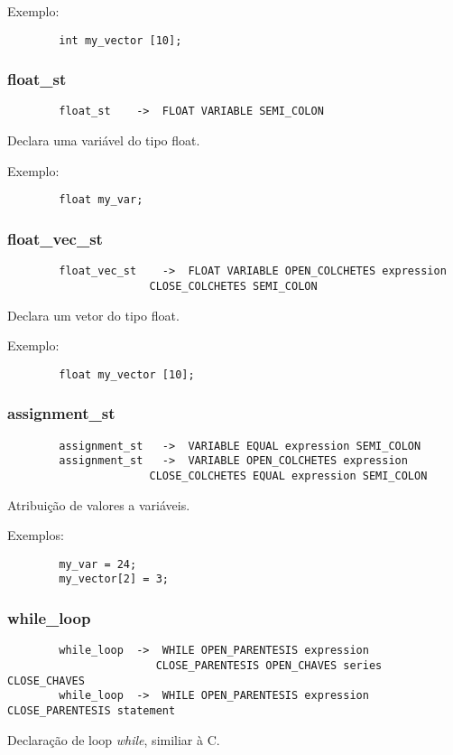 \documentclass[a4paper,10pt]{article}
\begin{document}
		Exemplo:
		\begin{lstlisting}
		int my_vector [10];
		\end{lstlisting}
		\vspace{10mm}
	\subsubsection{float\_st}
		\begin{lstlisting}
		float_st	->	FLOAT VARIABLE SEMI_COLON
		\end{lstlisting}
		Declara uma vari\'avel do tipo float.
		
		Exemplo:
		\begin{lstlisting}
		float my_var;
		\end{lstlisting}
		\vspace{10mm}
	\subsubsection{float\_vec\_st}
		\begin{lstlisting}
		float_vec_st	->	FLOAT VARIABLE OPEN_COLCHETES expression
					  CLOSE_COLCHETES SEMI_COLON
		\end{lstlisting}
		Declara um vetor do tipo float.
		
		Exemplo:
		\begin{lstlisting}
		float my_vector [10];
		\end{lstlisting}
		\vspace{10mm}
	\subsubsection{assignment\_st}
		\begin{lstlisting}
		assignment_st	->	VARIABLE EQUAL expression SEMI_COLON
		assignment_st	->	VARIABLE OPEN_COLCHETES expression
					  CLOSE_COLCHETES EQUAL expression SEMI_COLON
		\end{lstlisting}
		Atribuição de valores a vari\'aveis.
		
		Exemplos:
		\begin{lstlisting}
		my_var = 24;
		my_vector[2] = 3;
		\end{lstlisting}
		\vspace{10mm}
	\subsubsection{while\_loop}
		\begin{lstlisting}
		while_loop	->	WHILE OPEN_PARENTESIS expression
					   CLOSE_PARENTESIS OPEN_CHAVES series CLOSE_CHAVES
		while_loop	->	WHILE OPEN_PARENTESIS expression CLOSE_PARENTESIS statement 
		\end{lstlisting}
		Declara\c{c}\~ao de loop \emph{while}, similiar \`{a} C.
		
\end{document}

